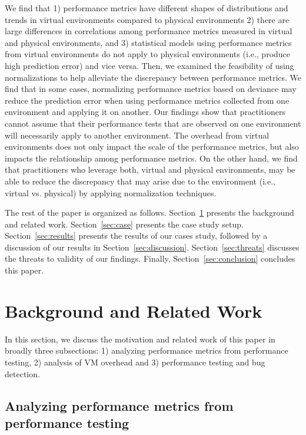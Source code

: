 \documentclass[smallextended]{svjour3}       %
\begin{document}
We find that 1) performance metrics have different shapes of distributions and trends in virtual environments compared to physical environments 2) there are large differences in correlations among performance metrics measured in virtual and physical environments, and 3) statistical models using performance metrics from virtual environments do not apply to physical environments (i.e., produce high prediction error) and vice versa. Then, we examined the feasibility of using normalizations to help alleviate the discrepancy between performance metrics. We find that in some cases, normalizing performance metrics based on deviance may reduce the prediction error when using performance metrics collected from one environment and applying it on another. Our findings show that practitioners cannot assume that their performance tests that are observed on one environment will necessarily apply to another environment. The overhead from virtual environments does not only impact the scale of the performance metrics, but also impacts the relationship among performance metrics. On the other hand, we find that practitioners who leverage both, virtual and physical environments, may be able to reduce the discrepancy that may arise due to the environment (i.e., virtual vs. physical) by applying normalization techniques.

The rest of the paper is organized as follows. Section~\ref{sec:related} presents the background and related work. Section~\ref{sec:case} presents the case study setup. Section~\ref{sec:results} presents the results of our cases study, followed by a discussion of our results in Section~\ref{sec:discussion}. Section~\ref{sec:threats} discusses the threats to validity of our findings. Finally, Section~\ref{sec:conclusion} concludes this paper.


\section{Background and Related Work}
\label{sec:related}
In this section, we discuss the motivation and related work of this paper in broadly three subsections: 1) analyzing performance metrics from performance testing, 2) analysis of VM overhead and 3) performance testing and bug detection.


\subsection{Analyzing performance metrics from performance testing} 
\end{document}
